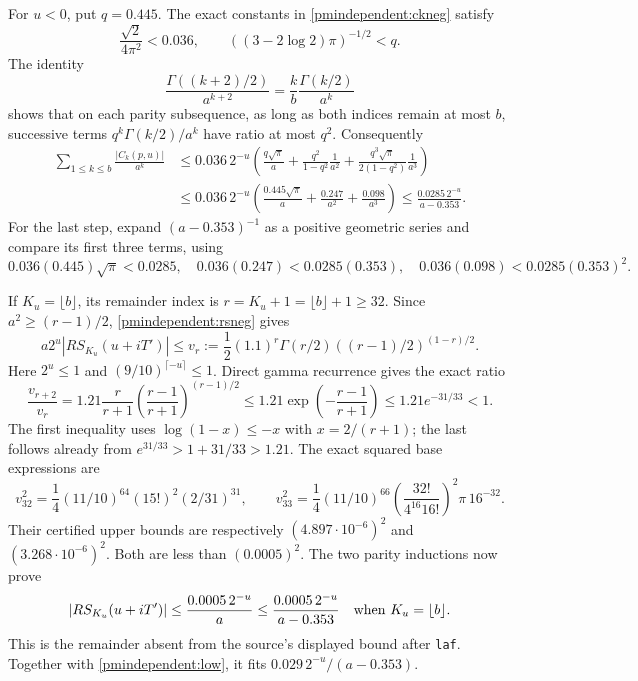 For $u<0$, put $q=0.445$. The exact constants in \eqref{pmindependent:ckneg}
satisfy
\[
 \frac{\sqrt2}{4\pi^2}<0.036,\qquad
 ((3-2\log2)\pi)^{-1/2}<q.
\]
The identity
\[
 \frac{\Gamma((k+2)/2)}{a^{k+2}}
 =\frac{k}{b}\frac{\Gamma(k/2)}{a^k}
\]
shows that on each parity subsequence, as long as both indices remain
at most $b$, successive terms $q^k\Gamma(k/2)/a^k$ have ratio at
most $q^2$. Consequently
\begin{align*}
 \sum_{1\le k\le b}\frac{|C_k(p,u)|}{a^k}
 &\le0.036\,2^{-u}\left(
 \frac{q\sqrt\pi}{a}+
 \frac{q^2}{1-q^2}\frac1{a^2}+
 \frac{q^3\sqrt\pi}{2(1-q^2)}\frac1{a^3}\right)\\
 &\le0.036\,2^{-u}\left(
 \frac{0.445\sqrt\pi}{a}+\frac{0.247}{a^2}+\frac{0.098}{a^3}\right)
 \le\frac{0.0285\,2^{-u}}{a-0.353}.\tag{L}\label{pmindependent:low}
\end{align*}
For the last step, expand $(a-0.353)^{-1}$ as a positive geometric
series and compare its first three terms, using
\[
 0.036(0.445)\sqrt\pi<0.0285,\quad
 0.036(0.247)<0.0285(0.353),\quad
 0.036(0.098)<0.0285(0.353)^2.
\]

If $K_u=\lfloor b\rfloor$, its remainder index is
$r=K_u+1=\lfloor b\rfloor+1\ge32$. Since
$a^2\ge(r-1)/2$, \eqref{pmindependent:rsneg} gives
\begin{equation}\label{pmindependent:vr}
 a2^u|RS_{K_u}(u+iT')|
 \le v_r:=\frac12(1.1)^r\Gamma(r/2)
                           ((r-1)/2)^{(1-r)/2}.
\end{equation}
Here $2^u\le1$ and $(9/10)^{\lceil-u\rceil}\le1$.
Direct gamma recurrence gives the exact ratio
\[
 \frac{v_{r+2}}{v_r}=1.21\frac r{r+1}
     \left(\frac{r-1}{r+1}\right)^{(r-1)/2}
 \le1.21\exp\!\left(-\frac{r-1}{r+1}\right)
 \le1.21e^{-31/33}<1.
\]
The first inequality uses $\log(1-x)\le-x$ with $x=2/(r+1)$;
the last follows already from $e^{31/33}>1+31/33>1.21$.
The exact squared base expressions are
\[
 v_{32}^2=\frac14(11/10)^{64}(15!)^2(2/31)^{31},\qquad
 v_{33}^2=\frac14(11/10)^{66}
 \left(\frac{32!}{4^{16}16!}\right)^2\pi\,16^{-32}.
\]
Their certified upper bounds are respectively
$(4.897\cdot10^{-6})^2$ and $(3.268\cdot10^{-6})^2$.
Both are less than $(0.0005)^2$. The two parity inductions now prove
\[
 |RS_{K_u}(u+iT')|\le\frac{0.0005\,2^{-u}}a
 \le\frac{0.0005\,2^{-u}}{a-0.353}
 \quad\hbox{when }K_u=\lfloor b\rfloor.
\]
This is the remainder absent from the source's displayed bound
after \texttt{laf}. Together with \eqref{pmindependent:low}, it fits
$0.029\,2^{-u}/(a-0.353)$.

